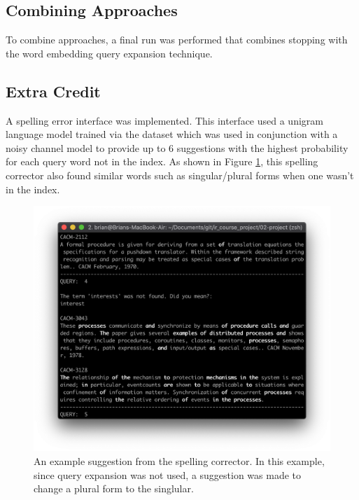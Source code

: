 \documentclass[conference]{IEEEtran}
\begin{document}
\subsection{Combining Approaches}
To combine approaches, a final run was performed that combines stopping with the word embedding query expansion technique.

\subsection{Extra Credit}
A spelling error interface was implemented. This interface used a unigram language model trained via the dataset which was used in conjunction with a noisy channel model to provide up to $6$ suggestions with the highest probability for each query word not in the index. As shown in Figure \ref{fig:spelling}, this spelling corrector also found similar words such as singular/plural forms when one wasn't in the index.

\begin{figure}
  \includegraphics[width=\textwidth]{suggestion}
  \caption{An example suggestion from the spelling corrector. In this example, since query expansion was not used, a suggestion was made to change a plural form to the singlular.}
  \label{fig:spelling}
\end{figure}
\end{document}
